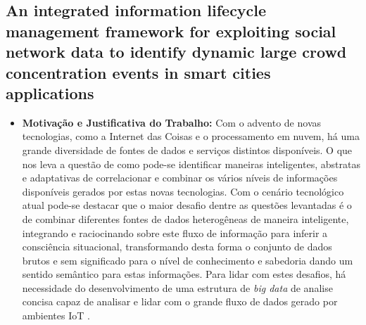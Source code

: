 \documentclass[tid,table]{texufpel} %
\begin{document}
\subsection{An integrated information lifecycle management framework for exploiting social network data to identify dynamic large crowd concentration events in smart cities applications}

\begin{itemize}
	\item \textbf{Motivação e Justificativa do Trabalho:} Com o advento de novas tecnologias, como a Internet das Coisas e o processamento em nuvem, há uma grande diversidade de fontes de dados e serviços distintos disponíveis. O que nos leva a questão de como pode-se identificar maneiras inteligentes, abstratas e adaptativas de correlacionar e combinar os vários níveis de informações disponíveis gerados por estas novas tecnologias. Com o cenário tecnológico atual pode-se destacar que o maior desafio dentre as questões levantadas é o de combinar diferentes fontes de dados heterogêneas de maneira inteligente, integrando e raciocinando sobre este fluxo de informação para inferir a consciência situacional, transformando desta forma o conjunto de dados brutos e sem significado para o nível de conhecimento e sabedoria dando um sentido semântico para estas informações. Para lidar com estes desafios, há necessidade do desenvolvimento de uma estrutura de \textit{big data} de analise concisa capaz de analisar e lidar com o grande fluxo de dados gerado por ambientes IoT \cite{art9kousiouris2018integrated}.	
	

\end{itemize}
\end{document}
